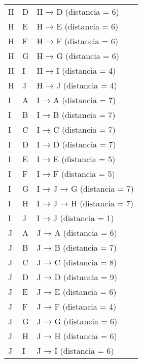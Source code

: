 \documentclass{article}
\begin{document}
\begin{longtable}{llp{}}
H & D & H → D (distancia = 6)\\
H & E & H → E (distancia = 6)\\
H & F & H → F (distancia = 6)\\
H & G & H → G (distancia = 6)\\
H & I & H → I (distancia = 4)\\
H & J & H → J (distancia = 4)\\
I & A & I → A (distancia = 7)\\
I & B & I → B (distancia = 7)\\
I & C & I → C (distancia = 7)\\
I & D & I → D (distancia = 7)\\
I & E & I → E (distancia = 5)\\
I & F & I → F (distancia = 5)\\
I & G & I → J → G (distancia = 7)\\
I & H & I → J → H (distancia = 7)\\
I & J & I → J (distancia = 1)\\
J & A & J → A (distancia = 6)\\
J & B & J → B (distancia = 7)\\
J & C & J → C (distancia = 8)\\
J & D & J → D (distancia = 9)\\
J & E & J → E (distancia = 6)\\
J & F & J → F (distancia = 4)\\
J & G & J → G (distancia = 6)\\
J & H & J → H (distancia = 6)\\
J & I & J → I (distancia = 6)\\
\bottomrule
\end{longtable}
\end{document}
